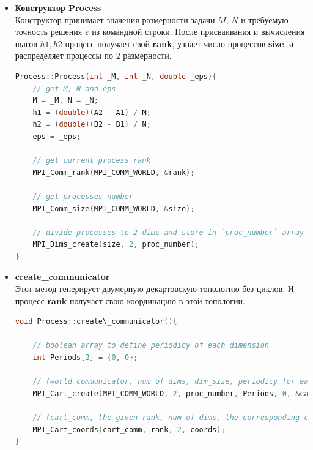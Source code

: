 \documentclass{article}
\begin{document}
\begin{itemize}
    \item \textbf{Конструктор Process}\\
    Конструктор принимает значения размерности задачи $M$, $N$ и требуемую точность решения $\varepsilon$ из командной строки. После присваивания и вычисления шагов $h1, h2$ процесс получает свой \textbf{rank}, узнает число процессов \textbf{size}, и распределяет процессы по 2 размерности.  
    \begin{lstlisting}[language=C, caption=Process::Process()]
Process::Process(int _M, int _N, double _eps){
    // get M, N and eps
    M = _M, N = _N;
    h1 = (double)(A2 - A1) / M;
    h2 = (double)(B2 - B1) / N; 
    eps = _eps;

    // get current process rank
    MPI_Comm_rank(MPI_COMM_WORLD, &rank);

    // get processes number
    MPI_Comm_size(MPI_COMM_WORLD, &size);

    // divide processes to 2 dims and store in `proc_number` array
    MPI_Dims_create(size, 2, proc_number);
}
    \end{lstlisting}
    \item \textbf{create\_communicator}\\
    Этот метод генерирует двумерную декартовскую топологию без циклов. И процесс \textbf{rank} получает свою координацию в этой топологии.
    \begin{lstlisting}[language=C, caption=Process::create\_communicator()]
void Process::create\_communicator(){

    // boolean array to define periodicy of each dimension
    int Periods[2] = {0, 0};

    // (world communicator, num of dims, dim_size, periodicy for each dimention, no reorder, cart_comm)
    MPI_Cart_create(MPI_COMM_WORLD, 2, proc_number, Periods, 0, &cart_comm);

    // (cart_comm, the given rank, num of dims, the corresponding coords)
    MPI_Cart_coords(cart_comm, rank, 2, coords);
}
    \end{lstlisting}
    

\end{itemize}
\end{document}
